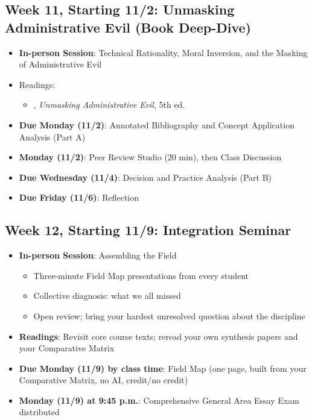 \documentclass[11pt]{article}     %
\begin{document}
\subsection*{Week 11, Starting 11/2: Unmasking Administrative Evil (Book Deep-Dive)}
\begin{itemize}
    \item \textbf{In-person Session}: Technical Rationality, Moral Inversion, and the Masking of Administrative Evil
    \item Readings:
        \begin{itemize}
            \item \citet{balfour2020}, \emph{Unmasking Administrative Evil}, 5th ed.
        \end{itemize}
    \item \textbf{Due Monday (11/2)}: Annotated Bibliography and Concept Application Analysis (Part A)
    \item \textbf{Monday (11/2)}: Peer Review Studio (20 min), then Class Discussion
    \item \textbf{Due Wednesday (11/4)}: Decision and Practice Analysis (Part B)
    \item \textbf{Due Friday (11/6)}: Reflection
\end{itemize}

\subsection*{Week 12, Starting 11/9: Integration Seminar}
\begin{itemize}
    \item \textbf{In-person Session}: Assembling the Field
    \begin{itemize}
        \item Three-minute Field Map presentations from every student
        \item Collective diagnosis: what we all missed
        \item Open review; bring your hardest unresolved question about the discipline
    \end{itemize}
    \item \textbf{Readings}: Revisit core course texts; reread your own synthesis papers and your Comparative Matrix
    \item \textbf{Due Monday (11/9) by class time}: Field Map (one page, built from your Comparative Matrix, no AI, credit/no credit)
    \item \textbf{Monday (11/9) at 9:45 p.m.}: Comprehensive General Area Essay Exam distributed
\end{itemize}
\end{document}
